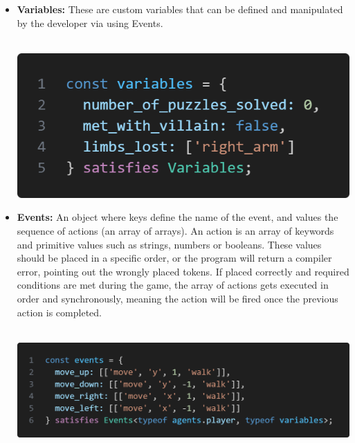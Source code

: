 \documentclass{article}
\begin{document}
\begin{itemize}
    \item \textbf{Variables:} These are custom variables that can be defined and manipulated by the developer via using Events.\\\\ 
    \begin{minipage}{\linewidth}
        \centering
        \includegraphics[width=1\textwidth]{variables.png}
        \label{fig:figure4}
    \end{minipage}
    
    \item \textbf{Events:} An object where keys define the name of the event, and values the sequence of actions (an array of arrays). An action is an array of keywords and primitive values such as strings, numbers or booleans. These values should be placed in a specific order, or the program will return a compiler error, pointing out the wrongly placed tokens. If placed correctly and required conditions are met during the game, the array of actions gets executed in order and synchronously, meaning the action will be fired once the previous action is completed.\\\\ 
        \begin{minipage}{\linewidth}
        \centering
        \includegraphics[width=1\textwidth]{events.png}
        \label{fig:figure5}
    \end{minipage}
    

\end{itemize}
\end{document}

